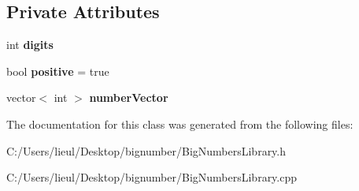 \subsection*{Private Attributes}
\begin{DoxyCompactItemize}
\item 
\mbox{\label{class_big_number_a9fd8d5a86d66539432f6411da2341ab9}} 
int {\bfseries digits}
\item 
\mbox{\label{class_big_number_acc2680f26ba2e9196e1d45ff3c4c96c5}} 
bool {\bfseries positive} = true
\item 
\mbox{\label{class_big_number_a83121a051754ba08d357663c1c0c31ca}} 
vector$<$ int $>$ {\bfseries number\+Vector}
\end{DoxyCompactItemize}


The documentation for this class was generated from the following files\+:\begin{DoxyCompactItemize}
\item 
C\+:/\+Users/lieul/\+Desktop/bignumber/Big\+Numbers\+Library.\+h\item 
C\+:/\+Users/lieul/\+Desktop/bignumber/Big\+Numbers\+Library.\+cpp\end{DoxyCompactItemize}
